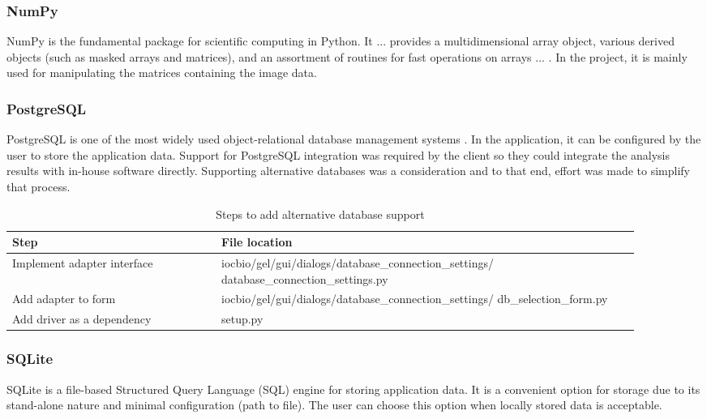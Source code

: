 \subsubsection{NumPy}
NumPy is the fundamental package for scientific computing in Python. It ... provides a multidimensional array object, various derived objects (such as masked arrays and matrices), and an assortment of routines for fast operations on arrays ... \cite{numpy}. In the project, it is mainly used for manipulating the matrices containing the image data.

\subsubsection{PostgreSQL}
PostgreSQL is one of the most widely used object-relational database management systems \cite{postgresql}. In the application, it can be configured by the user to store the application data.
Support for PostgreSQL integration was required by the client so they could integrate the analysis results with in-house software directly. Supporting alternative databases was a consideration
and to that end, effort was made to simplify that process.

\begin{table}[h!]

\small
\begin{tabular}{|p{0.30\linewidth} | p{0.60\linewidth}|}
 \hline
 \textbf{Step} &  \textbf{File location} \\
 \hline
Implement adapter interface & iocbio/gel/gui/dialogs/database\_connection\_settings/ database\_connection\_settings.py\\ \hline
Add adapter to form & iocbio/gel/gui/dialogs/database\_connection\_settings/ db\_selection\_form.py\\ \hline
Add driver as a dependency & setup.py\\ \hline
\end{tabular}
\caption{Steps to add alternative database support}
\end{table}

\subsubsection{SQLite}
SQLite is a file-based Structured Query Language (SQL) engine for storing application data. It is a convenient option for storage due to its stand-alone nature and minimal configuration (path to file). The user can choose this option when locally stored data is acceptable. \cite{sqlite}

